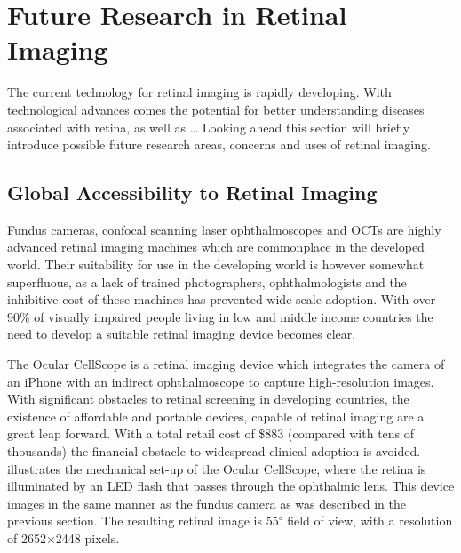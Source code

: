 
\chapter{Future Research in Retinal Imaging}

\label{future_research}

The current technology for retinal imaging is rapidly developing.
With technological advances comes the potential for better
understanding diseases associated with retina, as well as …
Looking ahead this section will briefly introduce possible future
research areas, concerns and uses of retinal imaging.

\section {Global Accessibility to Retinal Imaging}

Fundus cameras, confocal scanning laser ophthalmoscopes and OCTs are
highly advanced retinal imaging machines which are commonplace in the
developed world. Their suitability for use in the developing world is
however somewhat superfluous, as a lack of trained photographers,
ophthalmologists and the inhibitive cost of these machines has prevented
wide-scale adoption. With over 90\% of visually impaired people living
in low and middle income countries the need to develop a suitable
retinal imaging device becomes clear.\cite{burgess2013diabetic}

The Ocular CellScope is a retinal imaging device which integrates the
camera of an iPhone with an indirect ophthalmoscope to capture
high-resolution images. With significant obstacles to retinal screening
in developing countries, the existence of affordable and portable devices,
capable of retinal imaging are a great leap forward. With a total retail
cost of \$883 (compared with tens of thousands) the financial obstacle
to widespread clinical adoption is avoided.  illustrates
the mechanical set-up of the Ocular CellScope, where the retina is
illuminated by an LED flash that passes through the ophthalmic lens.
This device images in the same manner as the fundus camera as was described
in the previous section. The resulting retinal image is 55$^\circ$ field of
view, with a resolution of 2652×2448 pixels. \cite{medscape}

